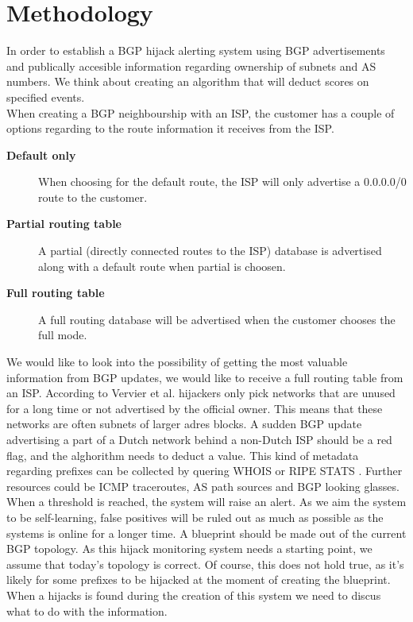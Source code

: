 \section{Methodology}
In order to establish a BGP hijack alerting system using BGP advertisements and publically accesible information regarding ownership of subnets and AS numbers. We think about creating an algorithm that will deduct scores on specified events.\\
When creating a BGP neighbourship with an ISP, the customer has a couple of options regarding to the route information it receives from the ISP. 

\begin{description}
\item[\textbf{Default only}] When choosing for the default route, the ISP will only advertise a 0.0.0.0/0 route to the customer.
\item[\textbf{Partial routing table}] A partial (directly connected routes to the ISP) database is advertised along with a default route when partial is choosen.
\item[\textbf{Full routing table}] A full routing database will be advertised when the customer chooses the full mode.
\end{description}

We would like to look into the possibility of getting the most valuable information from BGP updates, we would like to receive a full routing table from an ISP. According to Vervier et al. \cite{vervier2015mind} hijackers only pick networks that are unused for a long time or not advertised by the official owner. This means that these networks are often subnets of larger adres blocks. A sudden BGP update advertising a part of a Dutch network behind a non-Dutch ISP should be a red flag, and the alghorithm needs to deduct a value. This kind of metadata regarding prefixes can be collected by quering WHOIS or RIPE STATS \cite{ripestats}. Further resources could be ICMP traceroutes, AS path sources and BGP looking glasses. When a threshold is reached, the system will raise an alert. As we aim the system to be self-learning, false positives will be ruled out as much as possible as the systems is online for a longer time. A blueprint should be made out of the current BGP topology. As this hijack monitoring system needs a starting point, we assume that today's topology is correct. Of course, this does not hold true, as it's likely for some prefixes to be hijacked at the moment of creating the blueprint. When a hijacks is found during the creation of this system we need to discus what to do with the information.
